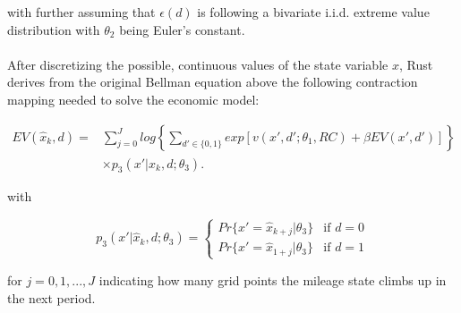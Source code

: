 with further assuming that $\epsilon(d)$ is following a bivariate i.i.d. extreme value distribution with $\theta_2$ being Euler's constant. \paragraph{}

After discretizing the possible, continuous values of the state variable $x$, Rust derives from the original Bellman equation above the following contraction mapping needed to solve the economic model:

\begin{equation}
	\label{eq9}
	\begin{split}
		EV(\hat x_k, d) = &\sum_{j=0}^{J} log \left\{ \sum_{d'\in\{0, 1\}}  exp[v(x', d'; \theta_1, RC) + \beta EV(x', d')]\right\} \\[+3mm]
		&\times p_3(x'|\hat x_k, d; \theta_3).
	\end{split}
\end{equation}

with

\[p_3(x'|\hat x_k, d; \theta_3) = \left\{
\begin{array}{lr}
	Pr\{x'=\hat x_{k+j}|\theta_3\}  & \mbox{if } d = 0 \\
	Pr\{x'=\hat x_{1+j}|\theta_3\} & \mbox{if } d = 1
\end{array}
\right.
\]

for $j=0, 1, ..., J$ indicating how many grid points the mileage state climbs up in the next period. \paragraph{}

